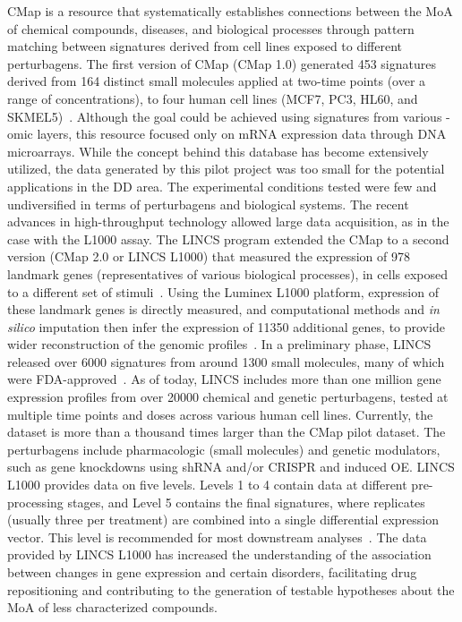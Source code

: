 \gls{CMap} is a resource that systematically establishes connections between the \gls{MoA} of chemical compounds, diseases, and biological processes through pattern matching between signatures derived from cell lines exposed to different perturbagens. The first version of CMap (CMap 1.0) generated 453 signatures derived from 164 distinct small molecules applied at two-time points (over a range of concentrations), to four human cell lines (MCF7, PC3, HL60, and SKMEL5)~\cite{RN34}.
Although the goal could be achieved using signatures from various -omic layers, this resource focused only on mRNA expression data through \gls{DNA} microarrays. While the concept behind this database has become extensively utilized, the data generated by this pilot project was too small for the potential applications in the \gls{DD} area. The experimental conditions tested were few and undiversified in terms of perturbagens and biological systems. 
The recent advances in high-throughput technology allowed large data acquisition, as in the case with the L1000 assay.
The \gls{LINCS} program extended the CMap to a second version (CMap 2.0 or LINCS L1000) that measured the expression of 978 landmark genes (representatives of various biological processes), in cells exposed to a different set of stimuli~\cite{RN30}. 
Using the Luminex L1000 platform, expression of these landmark genes is directly measured, and computational methods and \textit{in silico} imputation then infer the expression of 11350 additional genes, to provide wider reconstruction of the genomic profiles~\cite{RN30}. 
In a preliminary phase, LINCS released over 6000 signatures from around 1300 small molecules, many of which were FDA-approved~\cite{RN115}. 
As of today, LINCS includes more than one million gene expression profiles from over 20000 chemical and genetic perturbagens, tested at multiple time points and doses across various human cell lines. 
Currently, the dataset is more than a thousand times larger than the CMap pilot dataset. 
The perturbagens include pharmacologic (small molecules) and genetic modulators, such as gene knockdowns using \gls{shRNA} and/or CRISPR and induced \gls{OE}. 
LINCS L1000 provides data on five levels. 
Levels 1 to 4 contain data at different pre-processing stages, and Level 5 contains the final signatures, where replicates (usually three per treatment) are combined into a single differential expression vector. 
This level is recommended for most downstream analyses~\cite{RN30}. 
The data provided by LINCS L1000 has increased the understanding of the association between changes in gene expression and certain disorders, facilitating drug repositioning and contributing to the generation of testable hypotheses about the \gls{MoA} of less characterized compounds. 
